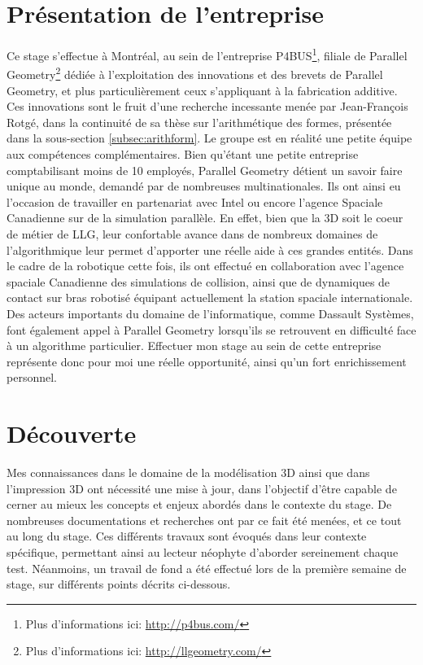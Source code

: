 \documentclass{tnreport}
\begin{document}
\chapter{Présentation de l'entreprise}
Ce stage s'effectue à Montréal, au sein de l'entreprise P4BUS\footnote{Plus d'informations ici: \url{http://p4bus.com/}}, filiale de Parallel Geometry\footnote{Plus d'informations ici: \url{http://llgeometry.com/}} dédiée à l'exploitation des innovations et des brevets de Parallel Geometry, et plus particulièrement ceux s'appliquant à la fabrication additive. Ces innovations sont le fruit d'une recherche incessante menée par Jean-François Rotgé, dans la continuité de sa thèse sur l'arithmétique des formes, présentée dans la sous-section \ref{subsec:arithform}. Le groupe est en réalité une petite équipe aux compétences complémentaires. Bien qu'étant une petite entreprise comptabilisant moins de 10 employés, Parallel Geometry détient un savoir faire unique au monde, demandé par de nombreuses multinationales. Ils ont ainsi eu l'occasion de travailler en partenariat avec Intel ou encore l'agence Spaciale Canadienne sur de la simulation parallèle. En effet, bien que la 3D soit le coeur de métier de LLG, leur confortable avance dans de nombreux domaines de l'algorithmique leur permet d'apporter une réelle aide à ces grandes entités. Dans le cadre de la robotique cette fois, ils ont effectué en collaboration avec l'agence spaciale Canadienne des simulations de collision, ainsi que de dynamiques de contact sur bras robotisé équipant actuellement la station spaciale internationale. Des acteurs importants du domaine de l'informatique, comme Dassault Systèmes, font également appel à Parallel Geometry lorsqu'ils se retrouvent en difficulté face à un algorithme particulier. Effectuer mon stage au sein de cette entreprise représente donc pour moi une réelle opportunité, ainsi qu'un fort enrichissement personnel. 

\cleardoublepage

\chapter{Découverte}

Mes connaissances dans le domaine de la modélisation 3D ainsi que dans l'impression 3D ont nécessité une mise à jour, dans l'objectif d'être capable de cerner au mieux les concepts et enjeux abordés dans le contexte du stage. De nombreuses documentations et recherches ont par ce fait été menées, et ce tout au long du stage. Ces différents travaux sont évoqués dans leur contexte spécifique, permettant ainsi au lecteur néophyte d'aborder sereinement chaque test. Néanmoins, un travail de fond a été effectué lors de la première semaine de stage, sur différents points décrits ci-dessous. 
\end{document}
